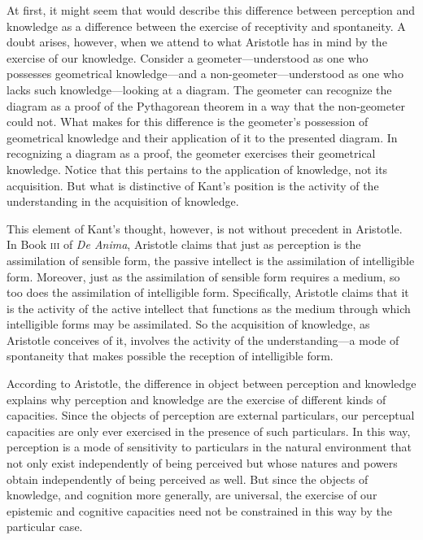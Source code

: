 At first, it might seem that \citet{Kant:1781fk} would describe this difference between perception and knowledge as a difference between the exercise of receptivity and spontaneity. A doubt arises, however, when we attend to what Aristotle has in mind by the exercise of our knowledge. Consider a geometer---understood as one who possesses geometrical knowledge---and a non-geo\-me\-ter\----understood as one who lacks such knowledge---looking at a diagram. The geometer can recognize the diagram as a proof of the Pythagorean theorem in a way that the non-geometer could not. What makes for this difference is the geometer's possession of geometrical knowledge and their application of it to the presented diagram. In recognizing a diagram as a proof, the geometer exercises their geometrical knowledge. Notice that this pertains to the application of knowledge, not its acquisition. But what is distinctive of Kant's position is the activity of the understanding in the acquisition of knowledge. 

This element of Kant's thought, however, is not without precedent in Aristotle. In Book \textsc{iii} of \emph{De Anima}, Aristotle claims that just as perception is the assimilation of sensible form, the passive intellect is the assimilation of intelligible form. Moreover, just as the assimilation of sensible form requires a medium, so too does the assimilation of intelligible form. Specifically, Aristotle claims that it is the activity of the active intellect that functions as the medium through which intelligible forms may be assimilated. So the acquisition of knowledge, as Aristotle conceives of it, involves the activity of the understanding---a mode of spontaneity that makes possible the reception of intelligible form.

According to Aristotle, the difference in object between perception and know\-ledge explains why perception and knowledge are the exercise of different kinds of capacities. Since the objects of perception are external particulars, our perceptual capacities are only ever exercised in the presence of such particulars. In this way, perception is a mode of sensitivity to particulars in the natural environment that not only exist independently of being perceived but whose natures and powers obtain independently of being perceived as well. But since the objects of knowledge, and cognition more generally, are universal, the exercise of our epistemic and cognitive capacities need not be constrained in this way by the particular case.

